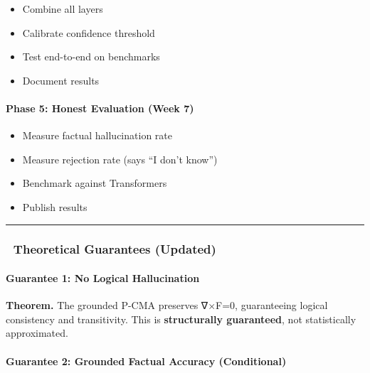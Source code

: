 \documentclass[
  11pt,
  a4paper,
]{article}
\providecommand{\tightlist}{%
  \setlength{\itemsep}{0pt}\setlength{\parskip}{0pt}}
\begin{document}
\begin{itemize}
\tightlist
\item[$\square$]
  Combine all layers
\item[$\square$]
  Calibrate confidence threshold
\item[$\square$]
  Test end-to-end on benchmarks
\item[$\square$]
  Document results
\end{itemize}

\paragraph{Phase 5: Honest Evaluation (Week
7)}\label{phase-5-honest-evaluation-week-7}

\begin{itemize}
\tightlist
\item[$\square$]
  Measure factual hallucination rate
\item[$\square$]
  Measure rejection rate (says ``I don't know'')
\item[$\square$]
  Benchmark against Transformers
\item[$\square$]
  Publish results
\end{itemize}

\begin{center}\rule{0.5\linewidth}{0.5pt}\end{center}

\subsubsection{🔬 Theoretical Guarantees
(Updated)}\label{theoretical-guarantees-updated}

\paragraph{Guarantee 1: No Logical
Hallucination}\label{guarantee-1-no-logical-hallucination}

\textbf{Theorem.} The grounded P-CMA preserves ∇×F=0, guaranteeing
logical consistency and transitivity. This is \textbf{structurally
guaranteed}, not statistically approximated.

\paragraph{Guarantee 2: Grounded Factual Accuracy
(Conditional)}\label{guarantee-2-grounded-factual-accuracy-conditional}
\end{document}

